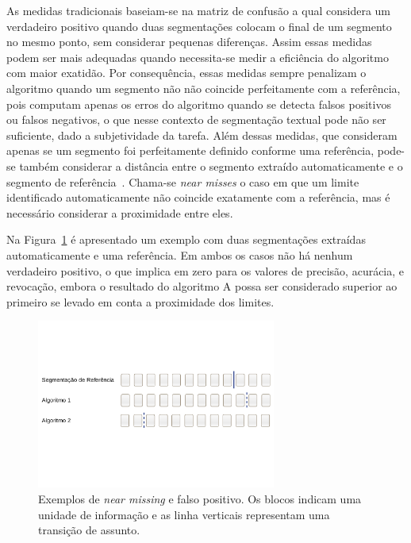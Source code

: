 As medidas tradicionais baseiam-se na matriz de confusão a qual considera um verdadeiro positivo quando duas segmentações colocam o final de um segmento no mesmo ponto, sem considerar pequenas diferenças. 
Assim essas medidas podem ser mais adequadas quando necessita-se medir a eficiência do algoritmo com maior exatidão. 
%
Por consequência, essas medidas sempre penalizam o algoritmo quando um segmento não não coincide perfeitamente com a referência, pois computam apenas os erros do algoritmo quando se detecta falsos positivos ou falsos negativos, o que nesse contexto de segmentação textual pode não ser suficiente, dado a subjetividade da tarefa. 
%
Além dessas medidas, que consideram apenas se um segmento foi perfeitamente definido conforme uma referência, pode-se também considerar a distância entre o segmento extraído automaticamente e o segmento de referência~\cite{Kern2009}. Chama-se \textit{near misses} o caso em que um limite identificado automaticamente não coincide exatamente com a referência, mas é necessário considerar a proximidade entre eles.

Na Figura~\ref{fig:exemplosegmentacaozoom} é apresentado um exemplo com duas segmentações extraídas automaticamente e uma referência. Em ambos os casos não há nenhum verdadeiro positivo, o que implica em zero para os valores de precisão, acurácia, e revocação, embora o resultado do algoritmo A possa ser considerado superior ao primeiro se levado em conta a proximidade dos limites.

  \begin{figure}[!h]

	\centering
	\includegraphics[trim={ 0 180 0 180 },clip,page=1,width=0.7\textwidth]{conteudo/capitulos/figs/near-missing.pdf}
	\caption{Exemplos de \textit{near missing} e falso positivo. Os blocos indicam uma unidade de informação e as linha verticais representam uma transição de assunto. }
	\label{fig:exemplosegmentacaozoom}

  \end{figure}





